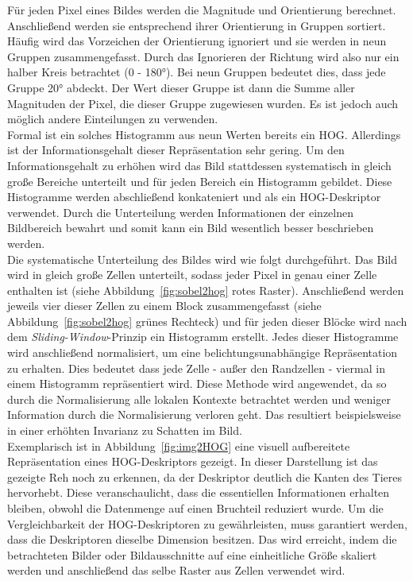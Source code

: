 Für jeden Pixel eines Bildes werden die Magnitude und Orientierung berechnet. Anschließend werden sie entsprechend ihrer Orientierung in Gruppen sortiert. Häufig wird das Vorzeichen der Orientierung ignoriert und sie werden in neun Gruppen zusammengefasst. Durch das Ignorieren der Richtung wird also nur ein halber Kreis betrachtet (0 - 180°). Bei neun Gruppen bedeutet dies, dass jede Gruppe 20° abdeckt. Der Wert dieser Gruppe ist dann die Summe aller Magnituden der Pixel, die dieser Gruppe zugewiesen wurden. Es ist jedoch auch möglich andere Einteilungen zu verwenden. \\
Formal ist ein solches Histogramm aus neun Werten bereits ein HOG. Allerdings ist der Informationsgehalt dieser Repräsentation sehr gering. Um den Informationsgehalt zu erhöhen wird das Bild stattdessen systematisch in gleich große Bereiche unterteilt und für jeden Bereich ein Histogramm gebildet. Diese Histogramme werden abschließend konkateniert und als ein HOG-Deskriptor verwendet. Durch die Unterteilung werden Informationen der einzelnen Bildbereich bewahrt und somit kann ein Bild wesentlich besser beschrieben werden. \\
Die systematische Unterteilung des Bildes wird wie folgt durchgeführt. Das Bild wird in gleich große Zellen unterteilt, sodass jeder Pixel in genau einer Zelle enthalten ist (siehe Abbildung~\ref{fig:sobel2hog} rotes Raster). Anschließend werden jeweils vier dieser Zellen zu einem Block zusammengefasst (siehe Abbildung~\ref{fig:sobel2hog} grünes Rechteck) und für jeden dieser Blöcke wird nach dem \textit{Sliding-Window}-Prinzip ein Histogramm erstellt. Jedes dieser Histogramme wird anschließend normalisiert, um eine belichtungsunabhängige Repräsentation zu erhalten. Dies bedeutet dass jede Zelle - außer den Randzellen - viermal in einem Histogramm repräsentiert wird. Diese Methode wird angewendet, da so durch die Normalisierung alle lokalen Kontexte betrachtet werden und weniger Information durch die Normalisierung verloren geht. Das resultiert beispielsweise in einer erhöhten Invarianz zu Schatten im Bild. \\
Exemplarisch ist in Abbildung~\ref{fig:img2HOG} eine visuell aufbereitete Repräsentation eines HOG-Deskriptors gezeigt. In dieser Darstellung ist das gezeigte Reh noch zu erkennen, da der Deskriptor deutlich die Kanten des Tieres hervorhebt. Diese veranschaulicht, dass die essentiellen Informationen erhalten bleiben, obwohl die Datenmenge auf einen Bruchteil reduziert wurde. Um die Vergleichbarkeit der HOG-Deskriptoren zu gewährleisten, muss garantiert werden, dass die Deskriptoren dieselbe Dimension besitzen. Das wird erreicht, indem die betrachteten Bilder oder Bildausschnitte auf eine einheitliche Größe skaliert werden und anschließend das selbe Raster aus Zellen verwendet wird.  \cite{dalal05}\cite{HOG1}

